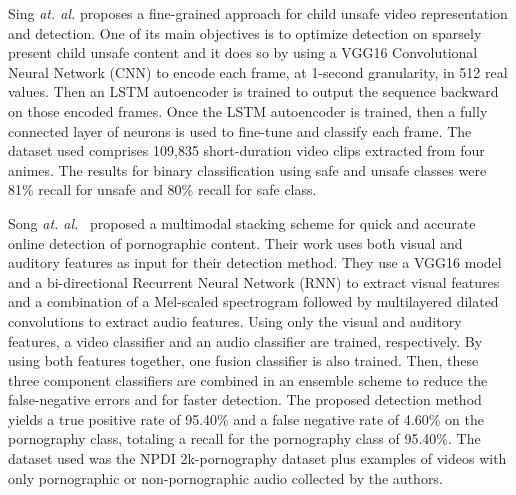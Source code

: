 Sing \textit{at. al.}\cite{singh2019kidsguard} proposes a fine-grained approach for child unsafe video representation and detection. One of its main objectives is to optimize detection on sparsely present child unsafe content and it does so by using a VGG16\cite{vgg} Convolutional Neural Network (CNN) to encode each frame, at 1-second granularity, in 512 real values. 
Then an LSTM autoencoder is trained to output the sequence backward on those encoded frames. 
Once the LSTM autoencoder is trained, then a fully connected layer of neurons is used to fine-tune and classify each frame. 
The dataset used comprises 109,835 short-duration video clips extracted from four animes. 
The results for binary classification using safe and unsafe classes were 81\% recall for unsafe and 80\% recall for safe class.

Song \textit{at. al.}~\cite{song2020enhanced} proposed a multimodal stacking scheme for quick and accurate online detection of pornographic content.
Their work uses both visual and auditory features as input for their detection method. 
They use a VGG16 model and a bi-directional Recurrent Neural Network (RNN) to extract visual features and a combination of a Mel-scaled spectrogram followed by multilayered dilated convolutions to extract audio features. 
Using only the visual and auditory features, a video classifier and an audio classifier are trained, respectively. 
By using both features together, one fusion classifier is also trained.
Then, these three component classifiers are combined in an ensemble scheme to reduce the false-negative errors and for faster detection. 
The proposed detection method yields a true positive rate of 95.40\% and a false negative rate of 4.60\% on the pornography class, totaling a recall for the pornography class of 95.40\%. 
The dataset used was the NPDI 2k-pornography\cite{2kdataset} dataset plus examples of videos with only pornographic or non-pornographic audio collected by the authors. 

